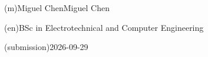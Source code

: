 %
%
\ntauthorname(m){Miguel Chen}{Miguel Chen}



%
%
%
\ntauthordegree(en){BSc in Electrotechnical and Computer Engineering}



%
%
%

%
%
 \ntdate(submission){2026-09-29}



